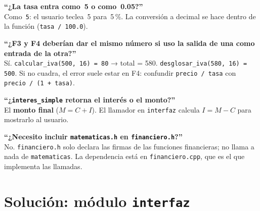 \documentclass[12pt, oneside]{article}
\begin{document}
\begin{notaprofesor}
  \textbf{``¿La tasa entra como~5 o como~0.05?''}\\
  Como~\texttt{5}: el usuario teclea~5 para~5\,\%.  La conversión a
  decimal se hace dentro de la función (\texttt{tasa / 100.0}).

  \medskip
  \textbf{``¿F3 y F4 deberían dar el mismo número si uso la salida de
  una como entrada de la otra?''}\\
  Sí.  \texttt{calcular\_iva(500, 16) = 80} → total = 580.
  \texttt{desglosar\_iva(580, 16) = 500}.  Si no cuadra, el error
  suele estar en F4: confundir \texttt{precio / tasa} con
  \texttt{precio / (1 + tasa)}.

  \medskip
  \textbf{``¿\texttt{interes\_simple} retorna el interés o el monto?''}\\
  El \textbf{monto final} ($M = C + I$).  El llamador en
  \texttt{interfaz} calcula $I = M - C$ para mostrarlo al usuario.

  \medskip
  \textbf{``¿Necesito incluir \texttt{matematicas.h} en
  \texttt{financiero.h}?''}\\
  No.  \texttt{financiero.h} solo declara las firmas de las funciones
  financieras; no llama a nada de \texttt{matematicas}.  La dependencia
  está en \texttt{financiero.cpp}, que es el que implementa las llamadas.
\end{notaprofesor}

\section{Solución: módulo \texttt{interfaz}}
\end{document}
